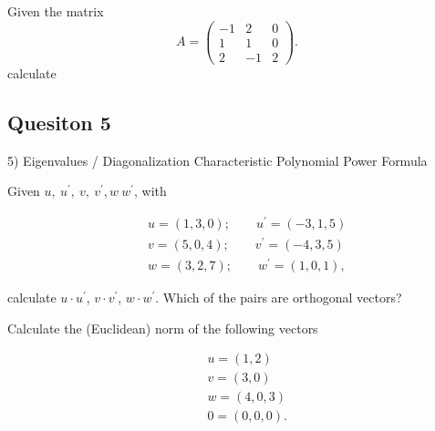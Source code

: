  Given the  matrix 
\begin{equation*}
A=\left( \begin{array}{rrr}
-1 & 2 & 0\\
1 & 1 & 0\\
2 & -1 & 2
\end{array} \right).
\end{equation*}
calculate
\subsection*{Quesiton 5}
5) Eigenvalues / Diagonalization
	Characteristic Polynomial
	Power Formula

\item Given
$u,\:u^{\prime},\:v,\:v^{\prime},w\:w^{\prime}$, with

\begin{eqnarray*}
& & u=(1,3,0);\qquad u^{\prime}=(-3,1,5)\\
& & v=(5,0,4);\qquad v^{\prime}=(-4,3,5)\\
& & w=(3,2,7);\qquad w^{\prime}=(1,0,1),
\end{eqnarray*}

calculate $u\cdot u^{\prime}$, $v\cdot v^{\prime}$, $w\cdot
w^{\prime}$. Which of the pairs are orthogonal vectors?

\vspace{0.25cm}\item Calculate the (Euclidean) norm of the
following vectors

\begin{eqnarray*}
& & u=(1,2)\\
& & v=(3,0)\\
& & w=(4,0,3)\\
& & 0=(0,0,0).
\end{eqnarray*}
